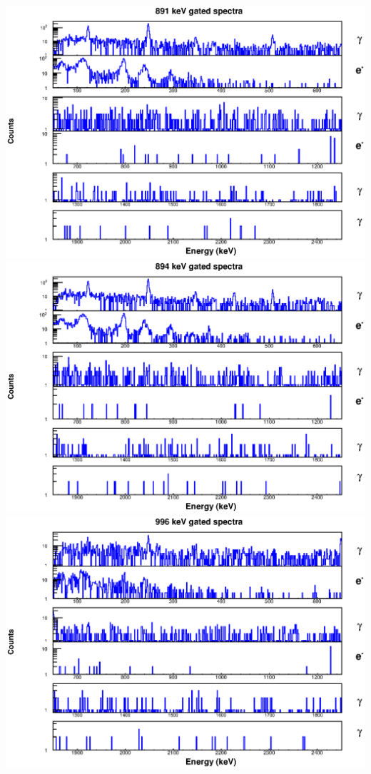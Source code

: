 \includegraphics[scale=0.8]{154Gd_Appendix/891_combined.eps}
\includegraphics[scale=0.8]{154Gd_Appendix/894_combined.eps}
\includegraphics[scale=0.8]{154Gd_Appendix/996_combined.eps}
